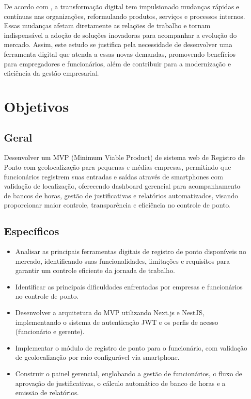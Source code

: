 De acordo com \textcite{Longo2019}, a transformação digital tem impulsionado mudanças rápidas e contínuas nas organizações, reformulando produtos, serviços e processos internos. Essas mudanças afetam diretamente as relações de trabalho e tornam indispensável a adoção de soluções inovadoras para acompanhar a evolução do mercado. Assim, este estudo se justifica pela necessidade de desenvolver uma ferramenta digital que atenda a essas novas demandas, promovendo benefícios para empregadores e funcionários, além de contribuir para a modernização e eficiência da gestão empresarial.


\section{Objetivos}

\subsection{Geral}

Desenvolver um MVP (Minimum Viable Product) de sistema web de Registro de Ponto com geolocalização para pequenas e médias empresas, permitindo que funcionários registrem suas entradas e saídas através de smartphones com validação de localização, oferecendo dashboard gerencial para acompanhamento de bancos de horas, gestão de justificativas e relatórios automatizados, visando proporcionar maior controle, transparência e eficiência no controle de ponto.

\subsection{Específicos}
\begin{itemize}
    \item Analisar as principais ferramentas digitais de registro de ponto disponíveis no mercado, identificando suas funcionalidades, limitações e requisitos para garantir um controle eficiente da jornada de trabalho.
    \item Identificar as principais dificuldades enfrentadas por empresas e funcionários no controle de ponto.
    \item Desenvolver a arquitetura do MVP utilizando Next.js e NestJS, implementando o sistema de autenticação JWT e os perfis de acesso (funcionário e gerente).
    \item Implementar o módulo de registro de ponto para o funcionário, com validação de geolocalização por raio configurável via smartphone.
    \item Construir o painel gerencial, englobando a gestão de funcionários, o fluxo de aprovação de justificativas, o cálculo automático de banco de horas e a emissão de relatórios.
\end{itemize}

